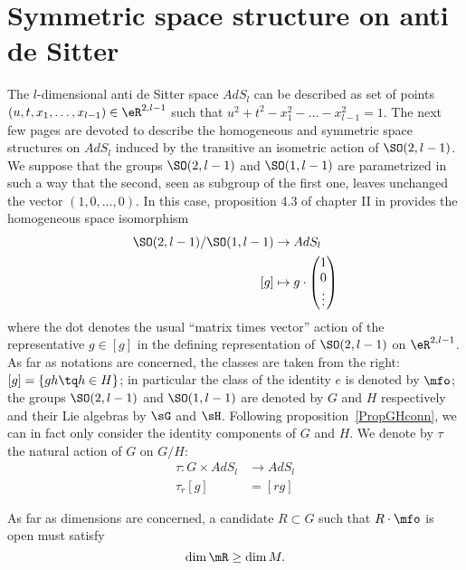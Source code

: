 \section{Symmetric space structure on anti de Sitter}\label{SecSymeStructAdS}

The $l$-dimensional anti de Sitter space $AdS_l$ can be described as set of points $(u,t,x_1,\ldots,x_{l-1})\in \eR^{2,l-1}$  such that $u^2+t^2-x_1^2-\ldots-x_{l-1}^2=1$. The next few pages are devoted to describe the homogeneous and symmetric space structures on $AdS_l$ induced by the transitive an isometric action of $\SO(2,l-1)$. We suppose that the groups $\SO(2,l-1)$ and $\SO(1,l-1)$ are parametrized in such a way that the second, seen as subgroup of the first one, leaves unchanged the vector $(1,0,\ldots,0)$. In this case, proposition 4.3 of chapter II in \cite{Helgason} provides the homogeneous space isomorphism
\begin{equation}
	\begin{aligned}
		\SO(2,l-1)/\SO(1,l-1) & \to AdS_l \\
		[g]                   & \mapsto
		g\cdot
		\begin{pmatrix}
			1 \\0\\\vdots
		\end{pmatrix}
	\end{aligned}
\end{equation}
where the dot denotes the usual ``matrix times vector'' action of the representative $g\in [g]$ in the defining representation of $\SO(2,l-1)$ on $\eR^{2,l-1}$. As far as notations are concerned, the classes are taken from the right:  $[g]=\{gh\tq h\in H\}$; in particular the class of the identity $e$ is denoted by $\mfo$; the groups $\SO(2,l-1)$ and $\SO(1,l-1)$ are denoted by $G$ and $H$ respectively and their Lie algebras by $\sG$ and $\sH$. Following proposition~\ref{PropGHconn}, we can in fact only consider the identity components of $G$ and $H$. We denote by $\tau$ the natural action of $G$ on $G/H$:
\begin{equation}
	\begin{aligned}
		\tau\colon G\times AdS_l & \to AdS_l \\
		\tau_r[g]                & = [rg]
	\end{aligned}
\end{equation}

As far as dimensions are concerned, a candidate $R\subset G$ such that $R\cdot\mfo$ is open must satisfy
\begin{equation}\label{cond_dim}
	\dim\mR\geq\dim M.
\end{equation}

